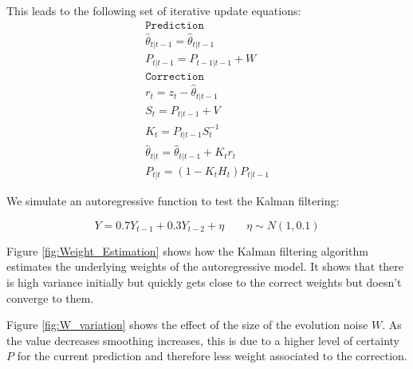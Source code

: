 \documentclass{sig-alternate-05-2015}
\begin{document}
This leads to the following set of iterative update equations:
\begin{align*}
\mathtt{Prediction} \\
\hat{\theta}_{t|t-1} = \hat{\theta}_{t|t-1} \\
P_{t|t-1} = P_{t-1|t-1} + W \\
\mathtt{Correction} \\
r_t = z_t - \hat{\theta}_{t|t-1} \\
S_t = P_{t|t-1} + V \\
K_t = P_{t|t-1}S_t^{-1} \\
\hat{\theta}_{t|t} = \hat{\theta}_{t|t-1} + K_tr_t \\
P_{t|t} = (1 - K_tH_t)P_{t|t-1}
\end{align*}

We simulate an autoregressive function to test the Kalman filtering: 

\begin{equation}
 Y = 0.7Y_{t-1} + 0.3Y_{t-2} + \eta \qquad \eta \sim N(1,0.1) \label{simulation}
\end{equation}

Figure \ref{fig:Weight_Estimation} shows how the Kalman filtering algorithm estimates the underlying weights of the autoregressive model. It shows that there is high variance initially but quickly gets close to the correct weights but doesn't converge to them. 

Figure \ref{fig:W_variation} shows the effect of the size of the evolution noise $W$. As the value decreases smoothing increases, this is due to a higher level of certainty $P$ for the current prediction and therefore less weight associated to the correction. 
\end{document}
